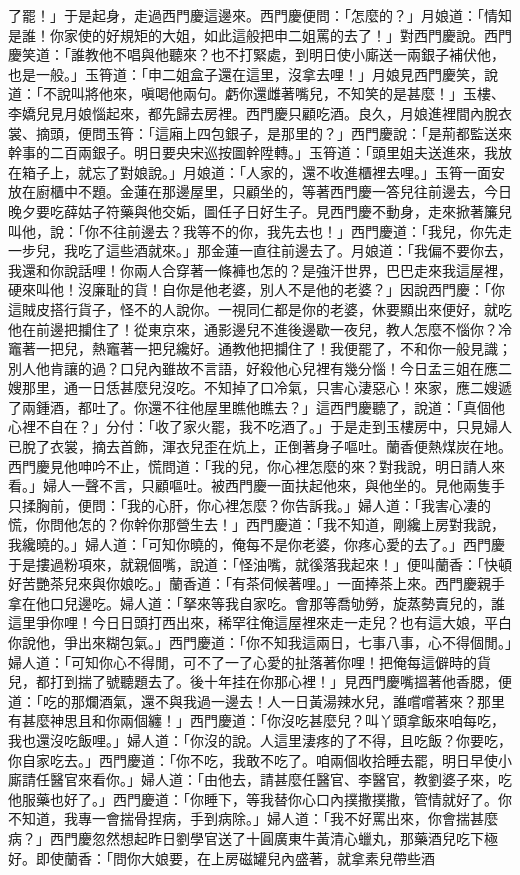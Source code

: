 \begin{showcontents}{}
了罷！」于是起身，走過西門慶這邊來。西門慶便問：「怎麼的？」月娘道：「情知是誰！你家使的好規矩的大姐，如此這般把申二姐罵的去了！」對西門慶說。西門慶笑道：「誰教他不唱與他聽來？也不打緊處，到明日使小廝送一兩銀子補伏他，也是一般。」玉筲道：「申二姐盒子還在這里，沒拿去哩！」月娘見西門慶笑，說道：「不說叫將他來，嗔喝他兩句。虧你還雌著嘴兒，不知笑的是甚麼！」玉樓、李嬌兒見月娘惱起來，都先歸去房裡。西門慶只顧吃酒。良久，月娘進裡間內脫衣裳、摘頭，便問玉筲：「這廂上四包銀子，是那里的？」西門慶說：「是荊都監送來幹事的二百兩銀子。明日要央宋巡按圖幹陞轉。」玉筲道：「頭里姐夫送進來，我放在箱子上，就忘了對娘說。」月娘道：「人家的，還不收進櫃裡去哩。」玉筲一面安放在廚櫃中不題。金蓮在那邊屋里，只顧坐的，等著西門慶一答兒往前邊去，今日晚夕要吃薛姑子符藥與他交姤，圖任子日好生子。見西門慶不動身，走來掀著簾兒叫他，說：「你不往前邊去？我等不的你，我先去也！」西門慶道：「我兒，你先走一步兒，我吃了這些酒就來。」那金蓮一直往前邊去了。月娘道：「我偏不要你去，我還和你說話哩！你兩人合穿著一條褲也怎的？是強汗世界，巴巴走來我這屋裡，硬來叫他！沒廉耻的貨！自你是他老婆，別人不是他的老婆？」因說西門慶：「你這賊皮搭行貨子，怪不的人說你。一視同仁都是你的老婆，休要顯出來便好，就吃他在前邊把攔住了！從東京來，通影邊兒不進後邊歇一夜兒，教人怎麼不惱你？冷竈著一把兒，熱竈著一把兒纔好。通教他把攔住了！我便罷了，不和你一般見識；別人他肯讓的過？口兒內雖故不言語，好殺他心兒裡有幾分惱！今日孟三姐在應二嫂那里，通一日恁甚麼兒沒吃。不知掉了口冷氣，只害心淒惡心！來家，應二嫂遞了兩鍾酒，都吐了。你還不往他屋里瞧他瞧去？」這西門慶聽了，說道：「真個他心裡不自在？」分付：「收了家火罷，我不吃酒了。」于是走到玉樓房中，只見婦人已脫了衣裳，摘去首飾，渾衣兒歪在炕上，正倒著身子嘔吐。蘭香便熱煤炭在地。西門慶見他呻吟不止，慌問道：「我的兒，你心裡怎麼的來？對我說，明日請人來看。」婦人一聲不言，只顧嘔吐。被西門慶一面扶起他來，與他坐的。見他兩隻手只揉胸前，便問：「我的心肝，你心裡怎麼？你告訴我。」婦人道：「我害心凄的慌，你問他怎的？你幹你那營生去！」西門慶道：「我不知道，剛纔上房對我說，我纔曉的。」婦人道：「可知你曉的，俺每不是你老婆，你疼心愛的去了。」西門慶于是摟過粉項來，就親個嘴，說道：「怪油嘴，就徯落我起來！」便叫蘭香：「快頓好苦艷茶兒來與你娘吃。」蘭香道：「有茶伺候著哩。」一面捧茶上來。西門慶親手拿在他口兒邊吃。婦人道：「拏來等我自家吃。會那等喬劬勞，旋蒸勢賣兒的，誰這里爭你哩！今日日頭打西出來，稀罕往俺這屋裡來走一走兒？也有這大娘，平白你說他，爭出來糊包氣。」西門慶道：「你不知我這兩日，七事八事，心不得個閒。」婦人道：「可知你心不得閒，可不了一了心愛的扯落著你哩！把俺每這僻時的貨兒，都打到揣了號聽題去了。後十年挂在你那心裡！」見西門慶嘴搵著他香腮，便道：「吃的那爛酒氣，還不與我過一邊去！人一日黃湯辣水兒，誰嚐嚐著來？那里有甚麼神思且和你兩個纏！」西門慶道：「你沒吃甚麼兒？叫丫頭拿飯來咱每吃，我也還沒吃飯哩。」婦人道：「你沒的說。人這里淒疼的了不得，且吃飯？你要吃，你自家吃去。」西門慶道：「你不吃，我敢不吃了。咱兩個收拾睡去罷，明日早使小廝請任醫官來看你。」婦人道：「由他去，請甚麼任醫官、李醫官，教劉婆子來，吃他服藥也好了。」西門慶道：「你睡下，等我替你心口內撲撒撲撒，管情就好了。你不知道，我專一會揣骨捏病，手到病除。」婦人道：「我不好罵出來，你會揣甚麼病？」西門慶忽然想起昨日劉學官送了十圓廣東牛黃清心蠟丸，那藥酒兒吃下極好。即使蘭香：「問你大娘要，在上房磁罐兒內盛著，就拿素兒帶些酒
\end{showcontents}
